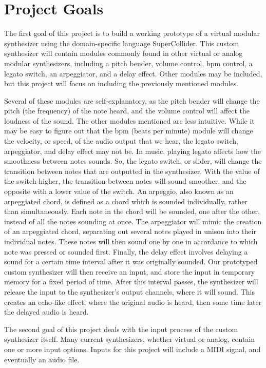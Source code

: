\section[Project Goals]{Project Goals}\label{project-goals}
The first goal of this project is to build a working prototype of a virtual modular synthesizer using the domain-specific language SuperCollider. This custom synthesizer will contain modules commonly found in other virtual or analog modular synthesizers, including a pitch bender, volume control, bpm control, a legato switch, an arpeggiator, and a delay effect. Other modules may be included, but this project will focus on including the previously mentioned modules. 

Several of these modules are self-explanatory, as the pitch bender will change the pitch (the frequency) of the note heard, and the volume control will affect the loudness of the sound. The other modules mentioned are less intuitive. While it may be easy to figure out that the bpm (beats per minute) module will change the velocity, or speed, of the audio output that we hear, the legato switch, arpeggiator, and delay effect may not be. In music, playing legato affects how the smoothness between notes sounds. So, the legato switch, or slider, will change the transition between notes that are outputted in the synthesizer. With the value of the switch higher, the transition between notes will sound smoother, and the opposite with a lower value of the switch. An arpeggio, also known as an arpeggiated chord, is defined as a chord which is sounded individually, rather than simultaneously. Each note in the chord will be sounded, one after the other, instead of all the notes sounding at once. The arpeggiator will mimic the creation of an arpeggiated chord, separating out several notes played in unison into their individual notes. These notes will then sound one by one in accordance to which note was pressed or sounded first. Finally, the delay effect involves delaying a sound for a certain time interval after it was originally sounded. Our prototyped custom synthesizer will then receive an input, and store the input in temporary memory for a fixed period of time. After this interval passes, the synthesizer will release the input to the synthesizer's output channels, where it will sound. This creates an echo-like effect, where the original audio is heard, then some time later the delayed audio is heard. 

The second goal of this project deals with the input process of the custom synthesizer itself. Many current synthesizers, whether virtual or analog, contain one or more input options. Inputs for this project will include a MIDI signal, and eventually an audio file. 